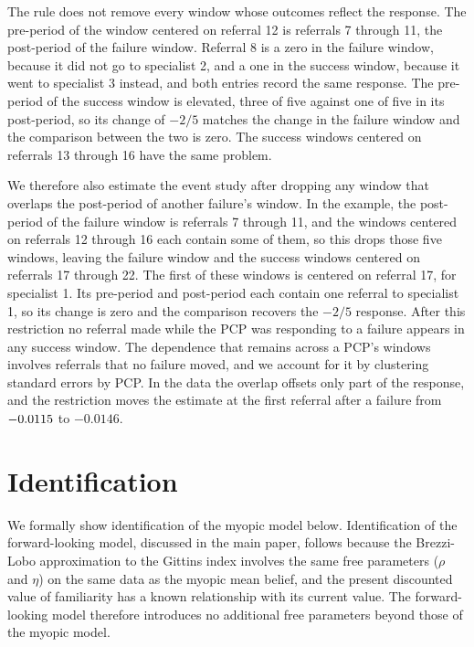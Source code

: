 \documentclass[12pt]{article}
\newcommand{\rereferESFirstSutva}{-0.0146}
\begin{document}
The rule does not remove every window whose outcomes reflect the response. The pre-period of the window centered on referral 12 is referrals 7 through 11, the post-period of the failure window. Referral 8 is a zero in the failure window, because it did not go to specialist 2, and a one in the success window, because it went to specialist 3 instead, and both entries record the same response. The pre-period of the success window is elevated, three of five against one of five in its post-period, so its change of $-2/5$ matches the change in the failure window and the comparison between the two is zero. The success windows centered on referrals 13 through 16 have the same problem.

We therefore also estimate the event study after dropping any window that overlaps the post-period of another failure's window. In the example, the post-period of the failure window is referrals 7 through 11, and the windows centered on referrals 12 through 16 each contain some of them, so this drops those five windows, leaving the failure window and the success windows centered on referrals 17 through 22. The first of these windows is centered on referral 17, for specialist 1. Its pre-period and post-period each contain one referral to specialist 1, so its change is zero and the comparison recovers the $-2/5$ response. After this restriction no referral made while the PCP was responding to a failure appears in any success window. The dependence that remains across a PCP's windows involves referrals that no failure moved, and we account for it by clustering standard errors by PCP. In the data the overlap offsets only part of the response, and the restriction moves the estimate at the first referral after a failure from $-0.0115{}$ to $\rereferESFirstSutva{}$.



\section{Identification} \label{app:identification}

We formally show identification of the myopic model below. Identification of the forward-looking model, discussed in the main paper, follows because the Brezzi-Lobo approximation to the Gittins index involves the same free parameters ($\rho$ and $\eta$) on the same data as the myopic mean belief, and the present discounted value of familiarity has a known relationship with its current value. The forward-looking model therefore introduces no additional free parameters beyond those of the myopic model.
\end{document}
